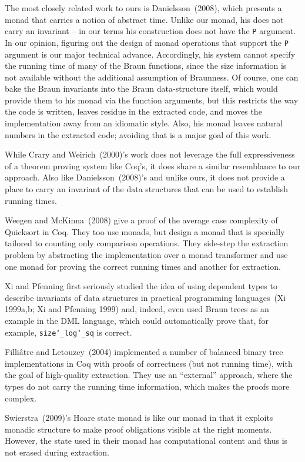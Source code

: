 \documentclass{llncs}
\newcommand{\Scribtexttt}[1]{{\texttt{#1}}}
\begin{document}
The most closely related work to ours is
Danielsson~(2008),
which presents a monad that carries a notion of abstract time. Unlike
our monad, his does not carry an invariant {--} in our terms his
construction does not have the \Scribtexttt{P} argument.  In our opinion,
figuring out the design of monad operations that support the \Scribtexttt{P}
argument is our major technical advance.  Accordingly, his system
cannot specify the running time of many of the Braun functions, since
the size information is not available without the additional
assumption of Braunness. Of course, one can bake the Braun invariants
into the Braun data{-}structure itself, which would provide them to his
monad via the function arguments, but this restricts the way the code
is written, leaves residue in the extracted code, and moves the
implementation away from an idiomatic style.  Also, his monad leaves
natural numbers in the extracted code; avoiding that is a major goal
of this work.

While Crary and Weirich~(2000){'}s work does not
leverage the full expressiveness of a theorem proving system
like Coq{'}s, it does share a similar resemblance to our approach.
Also like
Danielsson~(2008){'}s
and unlike ours, it does not provide a place to carry an
invariant of the data structures that can be used to
establish running times.

Weegen and McKinna~(2008)
give a proof of the average case complexity of Quicksort
in Coq. They too use monads, but design a monad that is
specially tailored to counting only comparison operations.
They side{-}step the extraction problem by abstracting the
implementation over a monad transformer and use one monad
for proving the correct running times and another for
extraction.

Xi and Pfenning first seriously studied the
idea of using dependent types to describe invariants of
data structures in practical programming
languages~(Xi 1999a,b; Xi and Pfenning 1999)
and, indeed, even used Braun trees as
an example in the DML language, which could
automatically prove that, for example, \Scribtexttt{size{\char`\_}log{\char`\_}sq} is
correct.

Filli\^{a}tre and Letouzey~(2004) implemented a number of
balanced binary tree implementations in Coq with proofs of
correctness (but not running time), with the goal of high{-}quality
extraction. They use an {``}external{''} approach, where the types
do not carry the running time information, which makes the proofs
more complex.

Swierstra~(2009){'}s Hoare state monad is like our
monad in that it exploits monadic structure to
make proof obligations visible at the right moments. However,
the state used in their monad has computational content and thus
is not erased during extraction.
\end{document}
